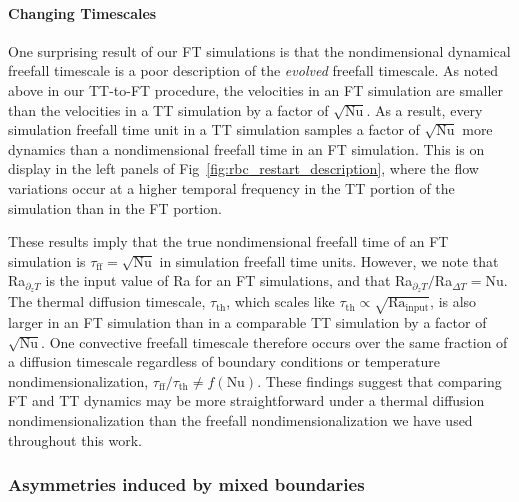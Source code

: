 \paragraph{Changing Timescales}
\label{sec:ft20_timescales}
One surprising result of our FT simulations is that the nondimensional dynamical freefall timescale is a poor description of the \emph{evolved} freefall timescale.
As noted above in our TT-to-FT procedure, the velocities in an FT simulation are smaller than the velocities in a TT simulation by a factor of $\sqrt{\text{Nu}}$.
As a result, every simulation freefall time unit in a TT simulation samples a factor of $\sqrt{\text{Nu}}$ more dynamics than a nondimensional freefall time in an FT simulation.
This is on display in the left panels of Fig~\ref{fig:rbc_restart_description}, where the flow variations occur at a higher temporal frequency in the TT portion of the simulation than in the FT portion.

These results imply that the true nondimensional freefall time of an FT simulation is $\tau_{\text{ff}} = \sqrt{\text{Nu}}$ in simulation freefall time units.
However, we note that Ra$_{\partial_z T}$ is the input value of Ra for an FT simulations, and that Ra$_{\partial_z T}/$Ra$_{\Delta T} = \text{Nu}$.
The thermal diffusion timescale, $\tau_{\text{th}}$, which scales like $\tau_{\text{th}} \propto \sqrt{\text{Ra}_{\text{input}}}$, is also larger in an FT simulation than in a comparable TT simulation by a factor of $\sqrt{\text{Nu}}$.
One convective freefall timescale therefore occurs over the same fraction of a diffusion timescale regardless of boundary conditions or temperature nondimensionalization, $\tau_{\text{ff}}/\tau_{\text{th}} \neq f(\text{Nu})$.
These findings suggest that comparing FT and TT dynamics may be more straightforward under a thermal diffusion nondimensionalization \citep{goluskin2016} than the freefall nondimensionalization we have used throughout this work.

\subsubsection{Asymmetries induced by mixed boundaries}
\label{sec:ft20_asymmetries}

